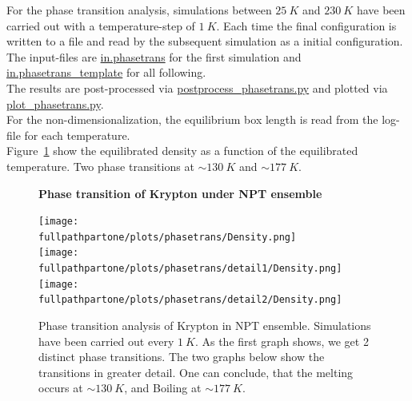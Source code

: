\documentclass[10pt,a4paper]{report}
\def \pathpartone {../../1_three-dimensional_atomic_system}
\def \fullpathpartone {/home/lukas/Desktop/project/independence/atomistic_modeling/exam/1_three-dimensional_atomic_system}
\newcommand*{\figuretitle}[1]{%
    {\centering%
    \textbf{#1}%
    \par\medskip}%
}
\begin{document}
For the phase transition analysis, simulations between $25~K$ and $230~K$ have been carried out with a temperature-step of $1~K$. Each time the final configuration is written to a file and read by the subsequent simulation as a initial configuration.\\
The input-files are \href{\pathpartone/in.phasetrans}{in.phasetrans} for the first simulation and \href{\pathpartone/in.phasetrans_template}{in.phasetrans\_template} for all following.\\
The results are post-processed via \href{\pathpartone/postprocess_phasetrans.py}{postprocess\_phasetrans.py} and plotted via \href{\pathpartone/plot_phasetrans.py}{plot\_phasetrans.py}.\\
For the non-dimensionalization, the equilibrium box length is read from the log-file for each temperature.\\
Figure~\ref{fig:p1_phasetransition_dens} show the equilibrated density as a function of the equilibrated temperature. Two phase transitions at $\sim130~K$ and $\sim177~K$. 



\begin{center}
\begin{figure}[h]
\figuretitle{Phase transition of Krypton under NPT ensemble}
\texttt{[image: \\fullpathpartone/plots/phasetrans/Density.png]}\\
\texttt{[image: \\fullpathpartone/plots/phasetrans/detail1/Density.png]}
\texttt{[image: \\fullpathpartone/plots/phasetrans/detail2/Density.png]}
\caption[Phase transition of Krypton under NPT ensemble]{Phase transition analysis of Krypton in NPT ensemble. Simulations have been carried out every $1~K$. As the first graph shows, we get 2 distinct phase transitions. The two graphs below show the transitions in greater detail. One can conclude, that the melting occurs at $\sim130~K$, and Boiling at $\sim177~K$.}
\label{fig:p1_phasetransition_dens}
\end{figure}
\end{center}
\end{document}
